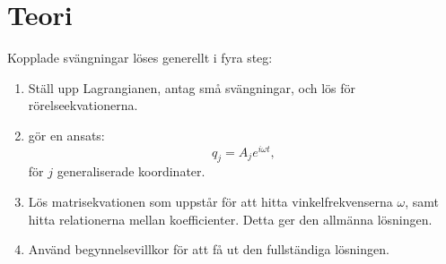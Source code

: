 \section{Teori}

Kopplade svängningar löses generellt i fyra steg:
\begin{enumerate}
    \item Ställ upp Lagrangianen, antag små svängningar, och lös för rörelseekvationerna.
    \item gör en ansats: \begin{equation}
        q_j = A_j e^{i\omega t},
    \end{equation}
    för $j$ generaliserade koordinater.
    
    \item Lös matrisekvationen som uppstår för att hitta vinkelfrekvenserna $\omega$, samt hitta relationerna mellan koefficienter. Detta ger den allmänna lösningen.
    \item Använd begynnelsevillkor för att få ut den fullständiga lösningen.
\end{enumerate}

